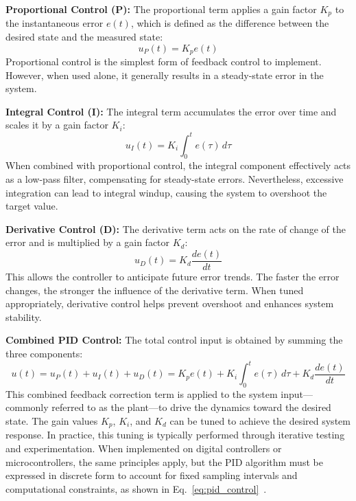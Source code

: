 \documentclass[english, bachelor, utf8]{base/thesis_telematics}
\begin{document}
\textbf{Proportional Control (P):}  
The proportional term applies a gain factor $K_p$ to the instantaneous error $e(t)$, which is defined as the difference between the desired state and the measured state:
\begin{equation}
    u_P(t) = K_p e(t)
    \label{eq:P}
\end{equation}
Proportional control is the simplest form of feedback control to implement. However, when used alone, it generally results in a steady-state error in the system.

\textbf{Integral Control (I):}  
The integral term accumulates the error over time and scales it by a gain factor $K_i$:
\begin{equation}
    u_I(t) = K_i \int_{0}^{t} e(\tau) \, d\tau
    \label{eq:I}
\end{equation}
When combined with proportional control, the integral component effectively acts as a low-pass filter, compensating for steady-state errors. Nevertheless, excessive integration can lead to integral windup, causing the system to overshoot the target value.

\textbf{Derivative Control (D):}  
The derivative term acts on the rate of change of the error and is multiplied by a gain factor $K_d$:
\begin{equation}
    u_D(t) = K_d \frac{de(t)}{dt}
    \label{eq:D}
\end{equation}
This allows the controller to anticipate future error trends. The faster the error changes, the stronger the influence of the derivative term. When tuned appropriately, derivative control helps prevent overshoot and enhances system stability.

\textbf{Combined PID Control:}  
The total control input is obtained by summing the three components:
\begin{equation}
    u(t) = u_P(t) + u_I(t) + u_D(t) 
         = K_p e(t) + K_i \int_{0}^{t} e(\tau)\, d\tau + K_d \frac{de(t)}{dt}
    \label{eq:PID}
\end{equation}
This combined feedback correction term is applied to the system input—commonly referred to as the plant—to drive the dynamics toward the desired state. The gain values $K_p$, $K_i$, and $K_d$ can be tuned to achieve the desired system response. In practice, this tuning is typically performed through iterative testing and experimentation. When implemented on digital controllers or microcontrollers, the same principles apply, but the PID algorithm must be expressed in discrete form to account for fixed sampling intervals and computational constraints, as shown in Eq.~\ref{eq:pid_control}~\cite{vectornav_math_controls,PIDBook2}.
\end{document}
